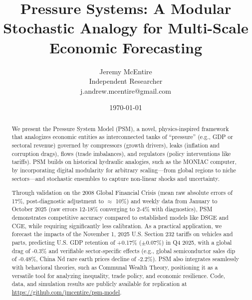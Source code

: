 \documentclass[11pt]{article}
\begin{document}
\title{Pressure Systems: A Modular Stochastic Analogy for Multi-Scale Economic Forecasting}

\author{Jeremy McEntire \\
Independent Researcher \\
j.andrew.mcentire@gmail.com}

\date{\today}

\maketitle

\begin{abstract}
We present the Pressure System Model (PSM), a novel, physics-inspired framework that analogizes economic entities as interconnected tanks of ``pressure'' (e.g., GDP or sectoral revenue) governed by compressors (growth drivers), leaks (inflation and corruption drags), flows (trade imbalances), and regulators (policy interventions like tariffs). PSM builds on historical hydraulic analogies, such as the MONIAC computer, by incorporating digital modularity for arbitrary scaling---from global regions to niche sectors---and stochastic ensembles to capture non-linear shocks and uncertainty.  

Through validation on the 2008 Global Financial Crisis (mean raw absolute errors of 17\%, post-diagnostic adjustment to $\approx$ 10\%) and weekly data from January to October 2025 (raw errors 12-18\% converging to 2-4\% with diagnostics), PSM demonstrates competitive accuracy compared to established models like DSGE and CGE, while requiring significantly less calibration. As a practical application, we forecast the impacts of the November 1, 2025 U.S. Section 232 tariffs on vehicles and parts, predicting U.S. GDP retention of +0.17\% ($\pm$0.07\%) in Q4 2025, with a global drag of -0.3\% and verifiable sector-specific effects (e.g., global semiconductor sales dip of -0.48\%, China Nd rare earth prices decline of -2.2\%). PSM also integrates seamlessly with behavioral theories, such as Communal Wealth Theory, positioning it as a versatile tool for analyzing inequality, trade policy, and economic resilience. Code, data, and simulation results are publicly available for replication at \url{https://github.com/jmcentire/psm-model}.
\end{abstract}

\end{document}
